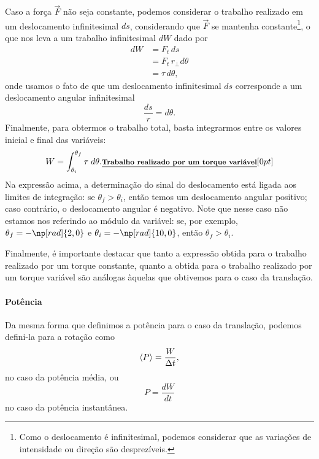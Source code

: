 Caso a força $\vec{F}$ não seja constante, podemos considerar o trabalho realizado em um deslocamento infinitesimal $ds$, considerando que $\vec{F}$ se mantenha constante\footnote{Como o deslocamento é infinitesimal, podemos considerar que as variações de intensidade ou direção são desprezíveis.}, o que nos leva a um trabalho infinitesimal $dW$ dado por
\begin{align}
    dW &= F_t \, ds \\
    &= F_t \, r_\perp d\theta \\
    &= \tau \,d\theta,
\end{align}
%
onde usamos o fato de que um deslocamento infinitesimal $ds$ corresponde a um deslocamento angular infinitesimal
\begin{equation}
    \frac{ds}{r} = d\theta.
\end{equation}
%
Finalmente, para obtermos o trabalho total, basta integrarmos entre os valores inicial e final das variáveis:
\begin{equation}
    W = \int_{\theta_i}^{\theta_f} \tau \;d\theta. \relax{\footnotesize\emph{\textbf{Trabalho realizado por um torque variável}}}[0pt]
\end{equation}
%
Na expressão acima, a determinação do sinal do deslocamento está ligada aos limites de integração: se $\theta_f > \theta_i$, então temos um deslocamento angular positivo; caso contrário, o deslocamento angular é negativo. Note que nesse caso não estamos nos referindo ao módulo da variável: se, por exemplo, $\theta_f = -\np[rad]{2,0}$ e $\theta_i = -\np[rad]{10,0}$, então $\theta_f > \theta_i$.


Finalmente, é importante destacar que tanto a expressão obtida para o trabalho realizado por um torque constante, quanto a obtida para o trabalho realizado por um torque variável são análogas àquelas que obtivemos para o caso da translação.

\paragraph{Potência}

Da mesma forma que definimos a potência para o caso da translação, podemos defini-la para a rotação como
\begin{equation}
    \left\langle{P}\right\rangle = \frac{W}{\Delta t},
\end{equation}
%
no caso da potência média, ou
\begin{equation}
    P = \frac{dW}{dt}
\end{equation}
%
no caso da potência instantânea.

